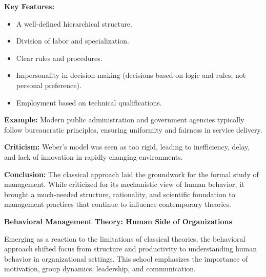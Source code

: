 \documentclass[10pt,a4paper]{book}
\begin{document}
\begin{enumerate}
    \textbf{Key Features:}
    \begin{itemize}
        \item A well-defined hierarchical structure.
        \item Division of labor and specialization.
        \item Clear rules and procedures.
        \item Impersonality in decision-making (decisions based on logic and rules, not personal preference).
        \item Employment based on technical qualifications.
    \end{itemize}

    \textbf{Example:} Modern public administration and government agencies typically follow bureaucratic principles, ensuring uniformity and fairness in service delivery.

    \textbf{Criticism:} Weber’s model was seen as too rigid, leading to inefficiency, delay, and lack of innovation in rapidly changing environments.
\end{enumerate}

\textbf{Conclusion:} The classical approach laid the groundwork for the formal study of management. While criticized for its mechanistic view of human behavior, it brought a much-needed structure, rationality, and scientific foundation to management practices that continue to influence contemporary theories.



\textbf{Behavioral Management Theory: Human Side of Organizations}

Emerging as a reaction to the limitations of classical theories, the behavioral approach shifted focus from structure and productivity to understanding human behavior in organizational settings. This school emphasizes the importance of motivation, group dynamics, leadership, and communication.
\end{document}
